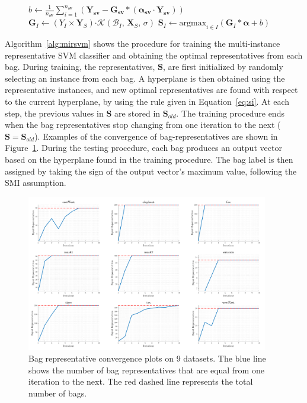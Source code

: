 \documentclass[reqno]{vcuthesis}
\newcommand{\set}[1]{{\left\{#1\right\}}}
\newcommand\tab[1][1cm]{\hspace*{#1}}
\numberwithin{equation}{chapter}
\begin{document}
\begin{figure}[t!]
\begin{minipage}{\textwidth}
\begin{algorithm}[H]
\begin{algorithmic}
\State $b \leftarrow \frac{1}{n_{\bm{sv}}}\sum_{i=1}^{n_{\bm{sv}}} \left(\bm Y_{\bm{sv}} - \bm G_{\bm{sv}}*\left(\bm{\alpha_{\bm{sv}}} \cdot \bm Y_{\bm{sv}}\right)\right)$ 
\For {$I \in \set{1,\ldots,n}$} 
\State $\bm G_I \leftarrow (Y_I \times \bm Y_S) \bm \cdot \mathcal{K}\left( \mathcal{B}_I,\,\bm X_S,\,\sigma\right)$
\State $\bm S_I \leftarrow \text{argmax}_{i \in I}\left(\bm G_I*\bm{\alpha} + b \right)$ \tab\tab[0.62cm]
\EndFor
\EndWhile 
\end{algorithmic}
\end{algorithm}
\end{minipage}
\end{figure}

Algorithm~\ref{alg:mirsvm} shows the procedure for training the multi-instance representative SVM classifier and obtaining the optimal representatives from each bag.  During training, the representatives, $\bm S$, are first initialized by randomly selecting an instance from each bag. A hyperplane is then obtained using the representative instances, and new optimal representatives are found with respect to the current hyperplane, by using the rule given in Equation~\eqref{eq:si}. At each step, the previous values in $\bm S$ are stored in $\bm S_{old}$. The training procedure ends when the bag representatives stop changing from one iteration to the next ($\bm S = \bm S_{old}$). Examples of the convergence of bag-representatives are shown in Figure~\ref{fig:convegence}. During the testing procedure, each bag produces an output vector based on the hyperplane found in the training procedure. The bag label is then assigned by taking the sign of the output vector's maximum value, following the SMI assumption. 

\begin{figure}[t!]
\centering
\includegraphics[width=0.94\textwidth]{figures/convergence.png} 
\caption{Bag representative convergence plots on 9 datasets. The blue line shows the number of bag representatives that are equal from one iteration to the next. The red dashed line represents the total number of bags.}\label{fig:convegence}
\end{figure}
\end{document}
